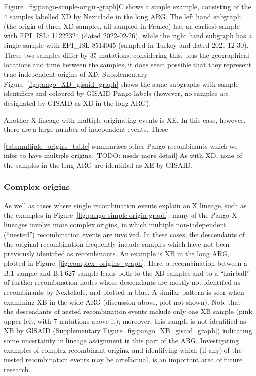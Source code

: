 \documentclass{article}
\begin{document}
Figure~\ref{fig:pango-simple-origin-graph}C shows a simple example, consisting of
the 4 samples labelled XD by Nextclade in the long ARG. The left hand subgraph
(the origin of three XD samples, all sampled in France) has an earliest
sample with EPI\_ISL: 11222324 (dated 2022-02-26), while the right hand
subgraph has a single sample with EPI\_ISL 8514045 (sampled in Turkey and dated 2021-12-30).
These two samples differ by 35 mutations; considering this, plus the geographical
locations and time between the samples,
it does seem possible that they represent true independent origins of XD.
Supplementary Figure~\ref{fig:pango_XD_gisaid_graph} shows the same subgraphs
with sample identifiers and coloured by GISAID Pango labels (however, no
samples are designated by GISAID as XD in the long ARG).

Another X lineage with multiple originating events is XE. In this case, however,
there are a large number of independent events. These

\ref{tab:multiple_origins_table} summarises other Pango recombinants which
we infer to have multiple origins. [TODO: needs more detail]
As with XD, none of the samples in the long ARG are identified as XE by GISAID.

\subsubsection{Complex origins}
As well as cases where single recombination events explain an X lineage,
such as the examples in Figure~\ref{fig:pango-simple-origin-graph}, many of the
Pango X lineages involve more complex origins,
in which multiple non-independent (``nested'') recombination events are involved.
In these cases, the descendants of the original recombination
frequently include samples which have not been previously identified as recombinants.
An example is XB in the long ARG,
plotted in Figure~\ref{fig:complex_origins_graph}. Here, a recombination
between a B.1 sample and B.1.627 sample leads both to the XB samples and to a
``hairball'' of further recombination nodes whose descendants are mostly not
identified as recombinants by Nextclade, and plotted in blue. A similar
pattern is seen when examining XB in the wide ARG (discussion above, plot not shown).
Note that the descendants of nested recombination events include only one
XB sample (pink upper left, with 7 mutations above it); moreover, this sample is
not identified as XB by GISAID (Supplementary Figure~\ref{fig:pango_XB_gisaid_graph})
indicating some uncertainty in lineage assignment in this part of the ARG.
Investigating examples of complex recombinant origins, and identifying which
(if any) of the nested recombination events may be artefactual, is an important
area of future research.
\end{document}
